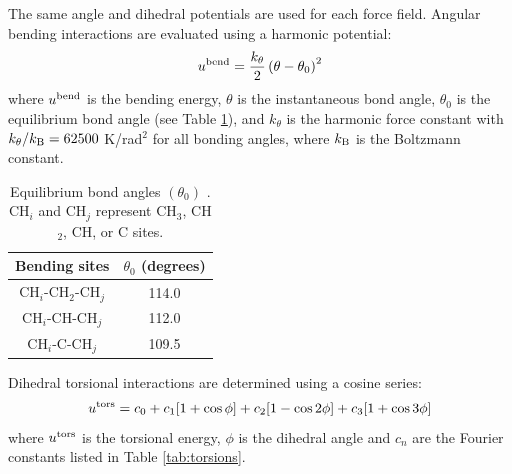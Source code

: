 \documentclass[preprint,review,12pt]{elsarticle}
\begin{document}
    
    
    The same angle and dihedral potentials are used for each force field. Angular bending interactions are evaluated using a harmonic potential:
	\begin{equation}
	u^{\rm bend} = \frac{k_\theta}{2} \left(\theta-\theta_0\right)^2
	\end{equation}
	where $u^{\rm bend}$ is the bending energy, $\theta$ is the instantaneous bond angle, $\theta_0$ is the equilibrium bond angle (see Table \ref{tab:angles}), and $k_\theta$ is the harmonic force constant with $k_\theta/k_{\rm B} = 62500$ K/rad$^2$ for all bonding angles, where $k_{\rm B}$ is the Boltzmann constant. 
	 
	 
	\begin{table}[h!]
		\caption{Equilibrium bond angles $(\theta_0)$ \cite{Martin1999}. CH$_i$ and CH$_j$ represent CH$_3$, CH$_2$, CH, or C sites.} \label{tab:angles}
		\begin{center}
			\begin{tabular}{|c|c|}
				\hline
				Bending sites & $\theta_0$ (degrees) \\ \hline
				CH$_i$-CH$_2$-CH$_j$ & 114.0 \\ 
				CH$_i$-CH-CH$_j$ & 112.0 \\ 
				CH$_i$-C-CH$_j$ & 109.5 \\  
				\hline
			\end{tabular}
		\end{center} 
	\end{table}
	
	Dihedral torsional interactions are determined using a cosine series:
	\begin{equation}
	u^{\rm tors} = c_0 + c_1 [1+\cos{\phi}] + c_2 [1-\cos{2\phi}] + c_3 [1+\cos{3\phi}]
	\end{equation}
	where $u^{\rm tors}$ is the torsional energy, $\phi$ is the dihedral angle and $c_n$ are the Fourier constants listed in Table \ref{tab:torsions}.
	
\end{document}
